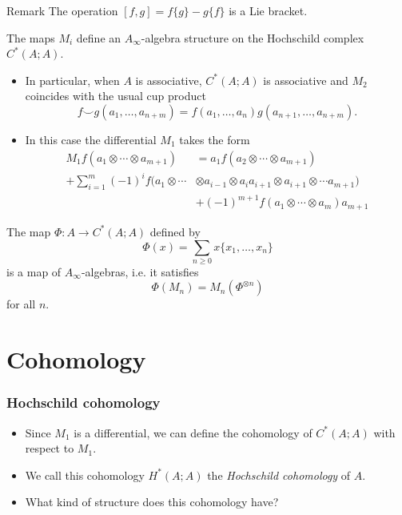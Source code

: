 \documentclass{beamer}
\theoremstyle{definition}
\begin{document}
\begin{frame}
\begin{block}{Remark}
The operation $[f,g]=f\{g\}-g\{f\}$ is a Lie bracket. 
\end{block}\pause
\begin{theorem}[Getzler]
The maps $M_i$ define an $A_\infty$-algebra structure on the Hochschild complex $C^*(A;A)$.
\end{theorem}

\end{frame}
\begin{frame}
\begin{itemize}
\item<1-> In particular, when $A$ is associative, $C^*(A;A)$ is associative and $M_2$ coincides with the usual cup product 
\[f\smile g(a_1,\dots,a_{n+m})=f(a_1,\dots, a_n)g(a_{n+1},\dots, a_{n+m}).\]
\item<2-> In this case the differential $M_1$ takes the form
 \begin{align*}
	 M_1 f(a_1\otimes\cdots\otimes a_{m+1})&=a_1f(a_2\otimes\cdots\otimes a_{m+1})\\
	  +\sum_{i=1}^m(-1)^if(a_1\otimes\cdots&\otimes a_{i-1}\otimes a_ia_{i+1}\otimes a_{i+1}\otimes\cdots a_{m+1})\\
	 & +(-1)^{m+1}f(a_1\otimes\cdots\otimes a_m)a_{m+1}
	 \end{align*}

\end{itemize}
\end{frame}

\begin{frame}
\begin{theorem}
The map $\Phi:A\to C^*(A;A)$ defined by \[\Phi(x)=\sum_{n\geq 0} x\{x_1,\dots, x_n\}\]
is a map of $A_\infty$-algebras, i.e. it satisfies 
\[\Phi(M_n)=M_n(\Phi^{\otimes n})\]
for all $n$.

\end{theorem}
\end{frame}
\section{Cohomology}
\begin{frame}
\frametitle{Hochschild cohomology}
\begin{itemize}
\item<1-> Since $M_1$ is a differential, we can define the  cohomology of $C^*(A;A)$ with respect to $M_1$. 
\item<2-> We call this cohomology $H^*(A;A)$ the \emph{Hochschild cohomology} of $A$.
\item<3-> What kind of structure does this cohomology have?
\end{itemize}
\end{frame}
\end{document}
